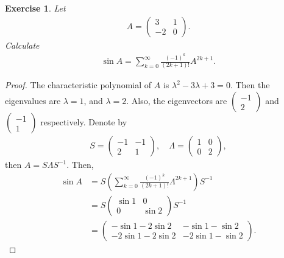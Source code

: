 \documentclass[11pt]{book}
\newtheorem{exercise}{Exercise}[section]
\theoremstyle{definition}
\numberwithin{equation}{chapter}
\begin{document}
\begin{exercise}
Let
\begin{align*}
    A = \begin{pmatrix} 
        3 & 1 \\ 
        -2 & 0 
    \end{pmatrix}.
\end{align*}
Calculate 
\begin{align*}
    \sin A = \sum^\infty_{k=0} \frac{(-1)^k}{(2k+1)!}A^{2k+1}.
\end{align*}
\end{exercise}
\begin{proof}
The characteristic polynomial of $A$ is $\lambda^2 - 3\lambda + 3 = 0$. Then the eigenvalues are $\lambda = 1$, and $\lambda = 2$. Also, the eigenvectors are $\begin{pmatrix} -1 \\ 2 \end{pmatrix}$ and $\begin{pmatrix} -1 \\ 1 \end{pmatrix}$ respectively. Denote by 
\begin{align*}
    S = \begin{pmatrix} 
        -1 & -1 \\ 
        2 & 1 
    \end{pmatrix}, \quad \Lambda = \begin{pmatrix} 
        1 & 0 \\ 
        0 & 2 
    \end{pmatrix},
\end{align*}
then $A = S \Lambda S^{-1}$. Then,
\begin{align*}
    \sin A & = S \left(\sum^\infty_{k=0}  \frac{(-1)^k}{(2k+1)!} \Lambda^{2k+1} \right) S^{-1} \\
    & = S \begin{pmatrix} 
        \sin 1 & 0 \\ 
        0 & \sin 2 
    \end{pmatrix} S^{-1} \\
    & = \begin{pmatrix} 
        -\sin 1 - 2\sin 2 & -\sin 1 - \sin 2 \\ 
        -2\sin 1 - 2\sin 2 & -2\sin 1 - \sin 2
    \end{pmatrix}.
\end{align*}
\end{proof}

\medskip
\end{document}

